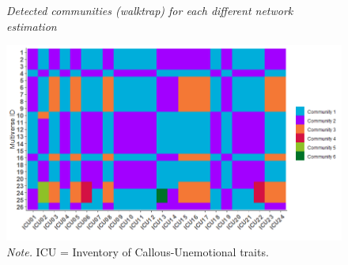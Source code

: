 \documentclass[a4paper,12pt]{article} %
\newcommand{\todo}[1]{\textcolor{red}{TODO: #1}\PackageWarning{TODO:}{#1!}} %
\begin{document}
\begin{figure}[H]
	\caption{\label{fig:communities}\protect\linebreak[1]\textit{Detected communities (walktrap) for each different network estimation}}
	\includegraphics[width=0.9\linewidth]{../figures/communities.png}
	\caption*{\textit{Note.} ICU = Inventory of Callous-Unemotional traits.}
\end{figure}


%
%




\end{document}
